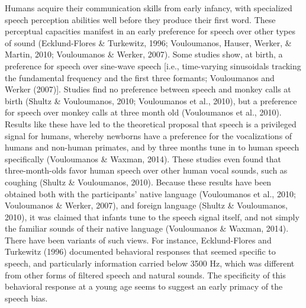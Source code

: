 \documentclass[
  english,
  man]{apa6}
\begin{document}
Humans acquire their communication skills from early infancy, with specialized speech perception abilities well before they produce their first word. These perceptual capacities manifest in an early preference for speech over other types of sound (Ecklund-Flores \& Turkewitz, 1996; Vouloumanos, Hauser, Werker, \& Martin, 2010; Vouloumanos \& Werker, 2007). Some studies show, at birth, a preference for speech over sine-wave speech {[}i.e., time-varying sinusoidals tracking the fundamental frequency and the first three formants; Vouloumanos and Werker (2007){]}. Studies find no preference between speech and monkey calls at birth (Shultz \& Vouloumanos, 2010; Vouloumanos et al., 2010), but a preference for speech over monkey calls at three month old (Vouloumanos et al., 2010). Results like these have led to the theoretical proposal that speech is a privileged signal for humans, whereby newborns have a preference for the vocalizations of humans and non-human primates, and by three months tune in to human speech specifically (Vouloumanos \& Waxman, 2014). These studies even found that three-month-olds favor human speech over other human vocal sounds, such as coughing (Shultz \& Vouloumanos, 2010). Because these results have been obtained both with the participants' native language (Vouloumanos et al., 2010; Vouloumanos \& Werker, 2007), and foreign language (Shultz \& Vouloumanos, 2010), it was claimed that infants tune to the speech signal itself, and not simply the familiar sounds of their native language (Vouloumanos \& Waxman, 2014). There have been variants of such views. For instance, Ecklund-Flores and Turkewitz (1996) documented behavioral responses that seemed specific to speech, and particularly information carried below 3500 Hz, which was different from other forms of filtered speech and natural sounds. The specificity of this behavioral response at a young age seems to suggest an early primacy of the speech bias.
\end{document}
